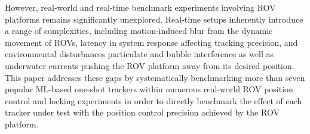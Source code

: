 However, real-world and real-time benchmark experiments involving ROV platforms remains significantly unexplored. Real-time setups inherently introduce a range of complexities, including motion-induced blur from the dynamic movement of ROVs, latency in system response affecting tracking precision, and environmental disturbances particulate and bubble interference as well as underwater currents pushing the ROV platform away from its desired position. %
%
This paper addresses these gaps by systematically benchmarking more than seven popular ML-based one-shot trackers within numerous real-world ROV position control and locking experiments in order to directly benchmark the effect of each tracker under test with the position control precision achieved by the ROV platform.




